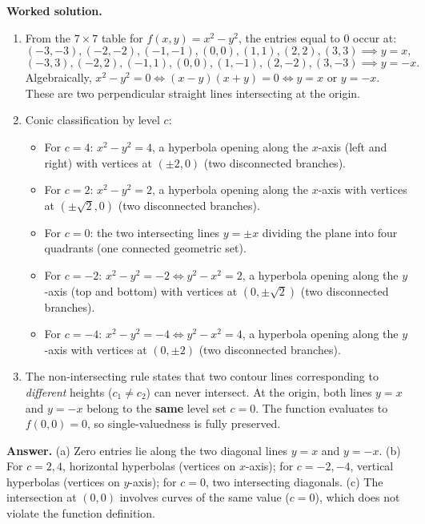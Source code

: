 \documentclass[11pt,letterpaper]{article}
\begin{document}
\textbf{Worked solution.}
\begin{enumerate}[label=(\alph*),leftmargin=*]
    \item From the $7 \times 7$ table for $f(x,y) = x^2 - y^2$, the entries equal to $0$ occur at:
    \[ (-3,-3), (-2,-2), (-1,-1), (0,0), (1,1), (2,2), (3,3) \implies y = x, \]
    \[ (-3,3), (-2,2), (-1,1), (0,0), (1,-1), (2,-2), (3,-3) \implies y = -x. \]
    Algebraically, $x^2 - y^2 = 0 \iff (x-y)(x+y) = 0 \iff y = x \text{ or } y = -x$. These are two perpendicular straight lines intersecting at the origin.
    \item Conic classification by level $c$:
    \begin{itemize}[nosep]
        \item For $c = 4$: $x^2 - y^2 = 4$, a hyperbola opening along the $x$-axis (left and right) with vertices at $(\pm 2, 0)$ (two disconnected branches).
        \item For $c = 2$: $x^2 - y^2 = 2$, a hyperbola opening along the $x$-axis with vertices at $(\pm\sqrt{2}, 0)$ (two disconnected branches).
        \item For $c = 0$: the two intersecting lines $y = \pm x$ dividing the plane into four quadrants (one connected geometric set).
        \item For $c = -2$: $x^2 - y^2 = -2 \iff y^2 - x^2 = 2$, a hyperbola opening along the $y$-axis (top and bottom) with vertices at $(0, \pm\sqrt{2})$ (two disconnected branches).
        \item For $c = -4$: $x^2 - y^2 = -4 \iff y^2 - x^2 = 4$, a hyperbola opening along the $y$-axis with vertices at $(0, \pm 2)$ (two disconnected branches).
    \end{itemize}
    \item The non-intersecting rule states that two contour lines corresponding to \emph{different} heights ($c_1 \ne c_2$) can never intersect. At the origin, both lines $y = x$ and $y = -x$ belong to the \textbf{same} level set $c = 0$. The function evaluates to $f(0,0) = 0$, so single-valuedness is fully preserved.
\end{enumerate}

\textbf{Answer.}
(a) Zero entries lie along the two diagonal lines $y = x$ and $y = -x$.
(b) For $c = 2, 4$, horizontal hyperbolas (vertices on $x$-axis); for $c = -2, -4$, vertical hyperbolas (vertices on $y$-axis); for $c = 0$, two intersecting diagonals.
(c) The intersection at $(0,0)$ involves curves of the same value ($c=0$), which does not violate the function definition.
\end{document}
